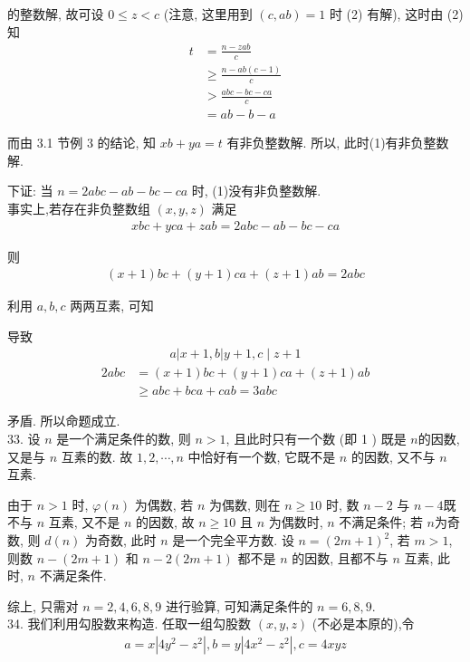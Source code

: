 的整数解, 故可设 $0 \leqslant z<c$ (注意, 这里用到 $(c, a b)=1$ 时 (2) 有解), 这时由 (2)知\begin{align}
	t & =\frac{n-z a b}{c}             \\
	  & \geqslant \frac{n-a b(c-1)}{c} \\
	  & >\frac{a b c-b c-c a}{c}       \\
	  & =a b-b-a
\end{align}

而由 3.1 节例 3 的结论, 知 $x b+y a=t$ 有非负整数解. 所以, 此时(1)有非负整数解.

下证: 当 $n=2 a b c-a b-b c-c a$ 时, (1)没有非负整数解.\\
事实上,若存在非负整数组 $(x, y, z)$ 满足
\begin{align*}
	x b c+y c a+z a b=2 a b c-a b-b c-c a
\end{align*}

则
\begin{align*}
	(x+1) b c+(y+1) c a+(z+1) a b=2 a b c
\end{align*}

利用 $a ,  b ,  c$ 两两互素, 可知

导致
\begin{align*}
	a|x+1, b| y+1, c \mid z+1
\end{align*}\begin{align}
	2 a b c & =(x+1) b c+(y+1) c a+(z+1) a b      \\
	        & \geqslant a b c+b c a+c a b=3 a b c
\end{align}

矛盾. 所以命题成立.\\
33. 设 $n$ 是一个满足条件的数, 则 $n>1$, 且此时只有一个数 (即 1 ) 既是 $n$的因数, 又是与 $n$ 互素的数. 故 $1,2, \cdots, n$ 中恰好有一个数, 它既不是 $n$ 的因数, 又不与 $n$ 互素.

由于 $n>1$ 时, $\varphi(n)$ 为偶数, 若 $n$ 为偶数, 则在 $n \geqslant 10$ 时, 数 $n-2$ 与 $n-4$既不与 $n$ 互素, 又不是 $n$ 的因数, 故 $n \geqslant 10$ 且 $n$ 为偶数时, $n$ 不满足条件; 若 $n$为奇数, 则 $d(n)$ 为奇数, 此时 $n$ 是一个完全平方数. 设 $n=(2 m+1)^{2}$, 若 $m>1$, 则数 $n-(2 m+1)$ 和 $n-2(2 m+1)$ 都不是 $n$ 的因数, 且都不与 $n$ 互素, 此时, $n$ 不满足条件.

综上, 只需对 $n=2,4,6,8,9$ 进行验算, 可知满足条件的 $n=6,8,9$.\\
34. 我们利用勾股数来构造. 任取一组勾股数 $(x, y, z)$ (不必是本原的),令
\begin{align*}
	a=x\left|4 y^{2}-z^{2}\right|, b=y\left|4 x^{2}-z^{2}\right|, c=4 x y z
\end{align*}

